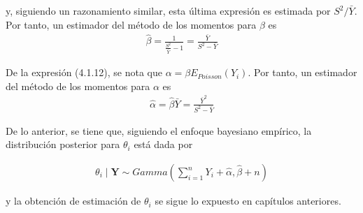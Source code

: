 y, siguiendo un razonamiento similar, esta última expresión es estimada por $S^2/\bar{Y}$. Por tanto, un estimador del método de los momentos para $\beta$ es
\begin{align}
\hat{\beta}=\frac{1}{\frac{S^2}{\bar{Y}}-1}=\frac{\bar{Y}}{S^2-\bar{Y}}
\end{align}

De la expresión (4.1.12), se nota que $\alpha=\beta E_{Poisson}(Y_i)$. Por tanto, un estimador del método de los momentos para $\alpha$ es
\begin{align}
\hat{\alpha}=\hat{\beta}\bar{Y}=\frac{\bar{Y}^2}{S^2-\bar{Y}}
\end{align}

De lo anterior, se tiene que, siguiendo el enfoque bayesiano empírico, la distribución posterior para $\theta_i$ está dada por

\begin{align*}
\theta_i \mid \mathbf{Y} \sim Gamma\left(\sum_{i=1}^n Y_i+\hat{\alpha},\hat{\beta}+n\right)
\end{align*}

y la obtención de estimación de $\theta_i$ se sigue lo expuesto en capítulos anteriores.

